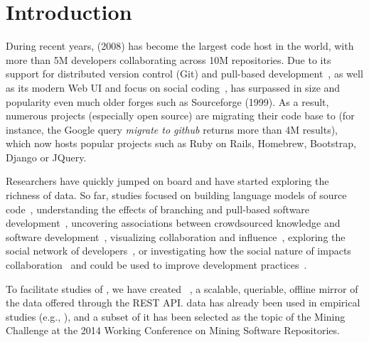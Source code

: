 
\section{Introduction}
\label{sec:intro}

During recent years, \gh (2008) has become the largest code host in the world, with more than 5M developers
collaborating across 10M repositories.
Due to its support for distributed version control (Git) and pull-based development~\cite{barr2012cohesive}, 
as well as its modern Web UI and focus on social coding~\cite{dabbish2012social}, \gh has surpassed in size
and popularity even much older forges such as Sourceforge (1999).
As a result, numerous projects (especially open source) are migrating their code base to \gh (for instance, 
the Google query \emph{migrate to github} returns more than 4M results), which now hosts popular projects
such as Ruby on Rails, Homebrew, Bootstrap, Django or JQuery.

Researchers have quickly jumped on board and have started exploring the richness of \gh data.
So far, studies focused on 
building language models of source code~\cite{allamanis2013mining}, 
understanding the effects of branching and pull-based software development~\cite{lee2013git, gousios2014exploratory}, 
uncovering associations between crowdsourced knowledge and software development~\cite{vasilescu2013stackoverflow},
visualizing collaboration and influence~\cite{heller2011visualizing}, 
exploring the social network of developers~\cite{thung2013network, schall2013follow, jiang2013understanding},
or investigating how the social nature of \gh impacts collaboration~\cite{dabbish2012social, marlow2013impression}
and could be used to improve development practices~\cite{pham2013creating, pham2013building}.

To facilitate studies of \gh, we have created \ght~\cite{gousios2012ghtorrent, gousios2013ghtorent}, a scalable, 
queriable, offline mirror of the data offered through the \gh REST API.
\ght data has already been used in empirical studies (e.g., \cite{gousios2014exploratory, squire2014forge, 
vasilescu2013stackoverflow}), and a subset of it has been selected as the topic of the Mining Challenge
at the 2014 Working Conference on Mining Software Repositories.




